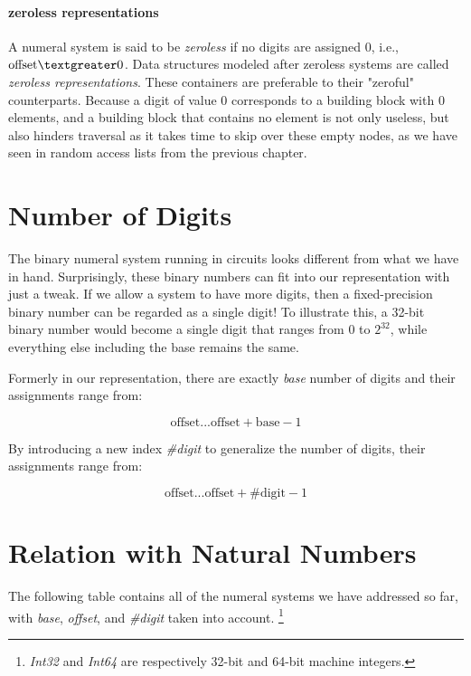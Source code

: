 \documentclass[../thesis.tex]{subfiles}
\begin{document}
\paragraph{zeroless representations}
A numeral system is said to be \textit{zeroless} if no digits are assigned $ 0 $,
i.e., $ \text{offset} \textgreater 0 $.
Data structures modeled after zeroless systems are called \textit{zeroless representations}.
These containers are preferable to their "zeroful" counterparts.
Because a digit of value $ 0 $ corresponds to a building block with $ 0 $ elements,
and a building block that contains no element is not only useless,
but also hinders traversal as it takes time to skip over these empty nodes,
as we have seen in random access lists from the previous chapter.

\section{Number of Digits}

The binary numeral system running in circuits looks different from what we have
in hand.
Surprisingly, these binary numbers can fit into our representation with just a tweak.
If we allow a system to have more digits,
then a fixed-precision binary number can be regarded as a single digit!
To illustrate this,
a 32-bit binary number would become a single digit that ranges from $ 0 $ to $ 2^{32} $,
while everything else including the base remains the same.

Formerly in our representation,
there are exactly \textit{base} number of digits and their assignments range from:

$$
    \text{offset}  ...  \text{offset} + \text{base} - 1
$$

By introducing a new index \textit{\#digit} to generalize the number of digits,
their assignments range from:

$$
    \text{offset}  ...  \text{offset} + \text{\#digit} - 1
$$



\section{Relation with Natural Numbers}

The following table contains all of the numeral systems we have addressed so far,
with \textit{base}, \textit{offset}, and \textit{\#digit} taken into account.
\footnote{
\textit{Int32} and \textit{Int64} are respectively 32-bit and 64-bit machine
integers.
}
\end{document}
